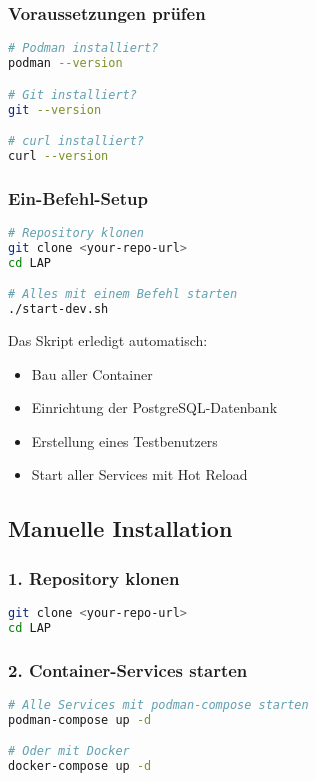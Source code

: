 \documentclass[a4paper,12pt]{article}
\begin{document}
\subsubsection{Voraussetzungen prüfen}
\begin{lstlisting}[language=bash]
# Podman installiert?
podman --version

# Git installiert?
git --version

# curl installiert?
curl --version
\end{lstlisting}

\subsubsection{Ein-Befehl-Setup}
\begin{lstlisting}[language=bash]
# Repository klonen
git clone <your-repo-url>
cd LAP

# Alles mit einem Befehl starten
./start-dev.sh
\end{lstlisting}

\begin{tipbox}
Das Skript erledigt automatisch:
\begin{itemize}
    \item Bau aller Container
    \item Einrichtung der PostgreSQL-Datenbank
    \item Erstellung eines Testbenutzers
    \item Start aller Services mit Hot Reload
\end{itemize}
\end{tipbox}

\subsection{Manuelle Installation}

\subsubsection{1. Repository klonen}
\begin{lstlisting}[language=bash]
git clone <your-repo-url>
cd LAP
\end{lstlisting}

\subsubsection{2. Container-Services starten}
\begin{lstlisting}[language=bash]
# Alle Services mit podman-compose starten
podman-compose up -d

# Oder mit Docker
docker-compose up -d
\end{lstlisting}
\end{document}
